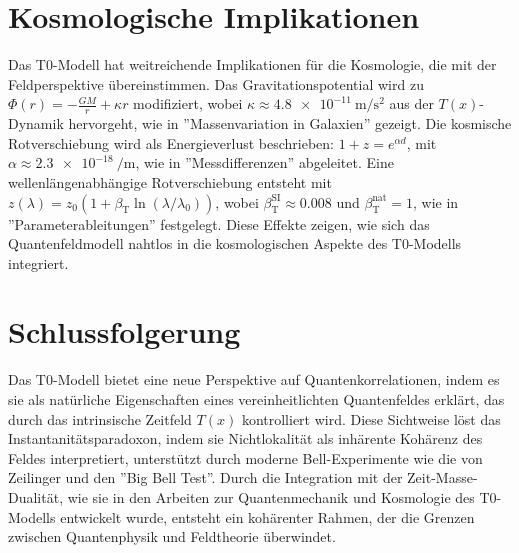 \documentclass[a4paper,12pt]{article}
\newcommand{\Tfield}{T(x)}
\newcommand{\betaT}{\beta_{\text{T}}}
\theoremstyle{definition}
\theoremstyle{remark}
\begin{document}
	\section{Kosmologische Implikationen}
	
	Das T0-Modell hat weitreichende Implikationen für die Kosmologie, die mit der Feldperspektive übereinstimmen. Das Gravitationspotential wird zu \(\Phi(r) = -\frac{G M}{r} + \kappa r\) modifiziert, wobei \(\kappa \approx \SI{4.8e-11}{\meter\per\second\squared}\) aus der \(\Tfield\)-Dynamik hervorgeht, wie in ''Massenvariation in Galaxien'' \cite{pascher_galaxies_2025} gezeigt. Die kosmische Rotverschiebung wird als Energieverlust beschrieben: \(1 + z = e^{\alpha d}\), mit \(\alpha \approx \SI{2.3e-18}{\per\meter}\), wie in ''Messdifferenzen'' \cite{pascher_messdifferenzen_2025} abgeleitet. Eine wellenlängenabhängige Rotverschiebung entsteht mit \(z(\lambda) = z_0 (1 + \betaT \ln(\lambda/\lambda_0))\), wobei \(\betaT^{\text{SI}} \approx 0.008\) und \(\betaT^{\text{nat}} = 1\), wie in ''Parameterableitungen'' \cite{pascher_params_2025} festgelegt. Diese Effekte zeigen, wie sich das Quantenfeldmodell nahtlos in die kosmologischen Aspekte des T0-Modells integriert.
	
	\section{Schlussfolgerung}
	
	Das T0-Modell bietet eine neue Perspektive auf Quantenkorrelationen, indem es sie als natürliche Eigenschaften eines vereinheitlichten Quantenfeldes erklärt, das durch das intrinsische Zeitfeld \(\Tfield\) kontrolliert wird. Diese Sichtweise löst das Instantanitätsparadoxon, indem sie Nichtlokalität als inhärente Kohärenz des Feldes interpretiert, unterstützt durch moderne Bell-Experimente wie die von Zeilinger und den ''Big Bell Test''. Durch die Integration mit der Zeit-Masse-Dualität, wie sie in den Arbeiten zur Quantenmechanik und Kosmologie des T0-Modells entwickelt wurde, entsteht ein kohärenter Rahmen, der die Grenzen zwischen Quantenphysik und Feldtheorie überwindet.
	
\end{document}
